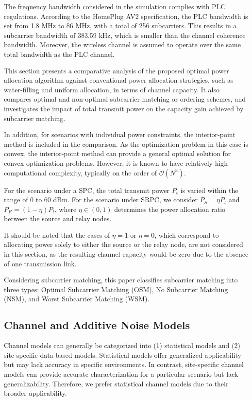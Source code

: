 \documentclass[lettersize,journal]{IEEEtran}
\begin{document}
	The frequency bandwidth considered in the simulation complies with PLC regulations. According to the HomePlug AV2 specification\cite{homeplug}, the PLC bandwidth is set from 1.8 MHz to 86 MHz, with a total of 256 subcarriers. This results in a subcarrier bandwidth of 383.59 kHz, which is smaller than the channel coherence bandwidth. Moreover, the wireless channel is assumed to operate over the same total bandwidth as the PLC channel.
	
	This section presents a comparative analysis of the proposed optimal power allocation algorithm against conventional power allocation strategies, such as water-filling and uniform allocation, in terms of channel capacity. It also compares optimal and non-optimal subcarrier matching or ordering schemes, and investigates the impact of total transmit power on the capacity gain achieved by subcarrier matching.
	
	In addition, for scenarios with individual power constraints, the interior-point method is included in the comparison. As the optimization problem in this case is convex, the interior-point method can provide a general optimal solution for convex optimization problems. However, it is known to have relatively high computational complexity, typically on the order of $\mathcal{O}(N^3)$.
	
	For the scenario under a SPC, the total transmit power $P_t$ is varied within the range of 0 to 60 dBm. For the scenario under SRPC, we consider $P_S = \eta P_t$ and $P_R = (1 - \eta) P_t$, where $\eta \in (0, 1)$ determines the power allocation ratio between the source and relay nodes.
	
	It should be noted that the cases of $\eta = 1$ or $\eta = 0$, which correspond to allocating power solely to either the source or the relay node, are not considered in this section, as the resulting channel capacity would be zero due to the absence of one transmission link.
	
	Considering subcarrier matching, this paper classifies subcarrier matching into three types: Optimal Subcarrier Matching (OSM), No Subcarrier Matching (NSM), and Worst Subcarrier Matching (WSM).
	
	\subsection{Channel and Additive Noise Models}
	
	Channel models can generally be categorized into (1) statistical models and (2) site-specific data-based models. Statistical models offer generalized applicability but may lack accuracy in specific environments. In contrast, site-specific channel models can provide accurate characterization for a particular scenario but lack generalizability. Therefore, we prefer statistical channel models due to their broader applicability.
	
\end{document}

